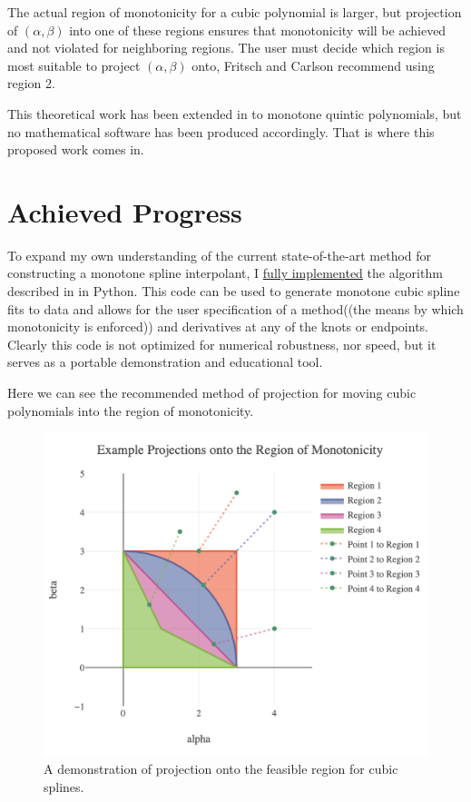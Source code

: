 The actual region of monotonicity for a cubic polynomial is larger, but projection of $(\alpha, \beta)$ into one of these regions ensures that monotonicity will be achieved and not violated for neighboring regions. The user must decide which region is most suitable to project $(\alpha, \beta)$ onto, Fritsch and Carlson recommend using region 2.

This theoretical work has been extended in \cite{ulrich1994positivity,hess1994positive} to monotone quintic polynomials, but no mathematical software has been produced accordingly. That is where this proposed work comes in.


\section{Achieved Progress}

To expand my own understanding of the current state-of-the-art method for constructing a monotone spline interpolant, I \href{https://github.com/tchlux/VarSys/blob/master/Disseration/cubic.py}{fully implemented} the algorithm described in \cite{fritsch1980monotone} in Python. This code can be used to generate monotone cubic spline fits to data and allows for the user specification of a method((the means by which monotonicity is enforced)) and derivatives at any of the knots or endpoints. Clearly this code is not optimized for numerical robustness, nor speed, but it serves as a portable demonstration and educational tool.

Here we can see the recommended method of projection for moving cubic polynomials into the region of monotonicity.

\begin{figure}[htb]
  \centering
  \includegraphics[scale=0.5]{Figures/splines/demo_projection.png}
  \caption{A demonstration of projection onto the feasible region for cubic splines.}
  \label{fig:demo_projection}
\end{figure}


